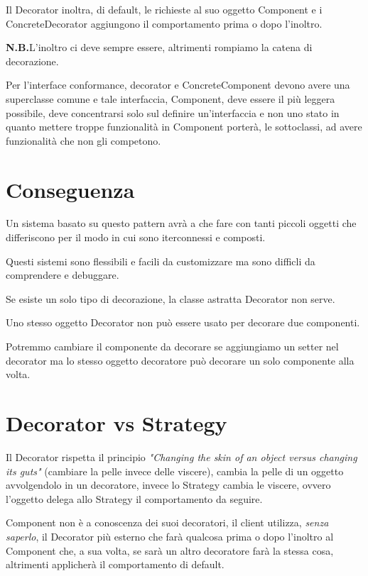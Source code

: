 Il Decorator inoltra, di default, le richieste al suo oggetto Component e i ConcreteDecorator aggiungono il comportamento prima o dopo l'inoltro.

\medskip
\textbf{N.B.}L'inoltro ci deve sempre essere, altrimenti rompiamo la catena di decorazione.
\medskip

Per l’interface conformance, decorator e ConcreteComponent devono avere una superclasse comune e tale interfaccia, Component, deve essere il più leggera possibile, 
deve concentrarsi solo sul definire un'interfaccia e non uno stato in quanto mettere troppe funzionalità in Component porterà, le sottoclassi, ad avere funzionalità 
che non gli competono.

\section{Conseguenza}

Un sistema basato su questo pattern avrà a che fare con tanti piccoli oggetti che differiscono per il modo in cui sono iterconnessi e composti.

Questi sistemi sono flessibili e facili da customizzare ma sono difficli da comprendere e debuggare.

Se esiste un solo tipo di decorazione, la classe astratta Decorator non serve.

Uno stesso oggetto Decorator non può essere usato per decorare due componenti.

Potremmo cambiare il componente da decorare se aggiungiamo un setter nel decorator ma lo stesso oggetto decoratore può decorare un solo componente alla volta.

\section{Decorator vs Strategy}

Il Decorator rispetta il principio \textit{"Changing the skin of an object versus changing its guts"} (cambiare la pelle invece delle viscere), cambia la pelle di un 
oggetto avvolgendolo in un decoratore, invece lo Strategy cambia le viscere, ovvero l'oggetto delega allo Strategy il comportamento da seguire.

Component non è a conoscenza dei suoi decoratori, il client utilizza, \textit{senza saperlo}, il Decorator più esterno che farà qualcosa prima o dopo l'inoltro al 
Component che, a sua volta, se sarà un altro decoratore farà la stessa cosa, altrimenti applicherà il comportamento di default.


